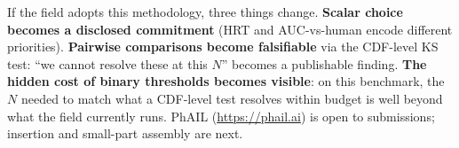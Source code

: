 \documentclass{article}
\begin{document}
If the field adopts this methodology, three things change. \textbf{Scalar choice becomes a disclosed commitment} (HRT and AUC-vs-human encode different priorities). \textbf{Pairwise comparisons become falsifiable} via the CDF-level KS test: ``we cannot resolve these at this $N$'' becomes a publishable finding. \textbf{The hidden cost of binary thresholds becomes visible}: on this benchmark, the $N$ needed to match what a CDF-level test resolves within budget is well beyond what the field currently runs. PhAIL (\url{https://phail.ai}) is open to submissions; insertion and small-part assembly are next.


\end{document}

